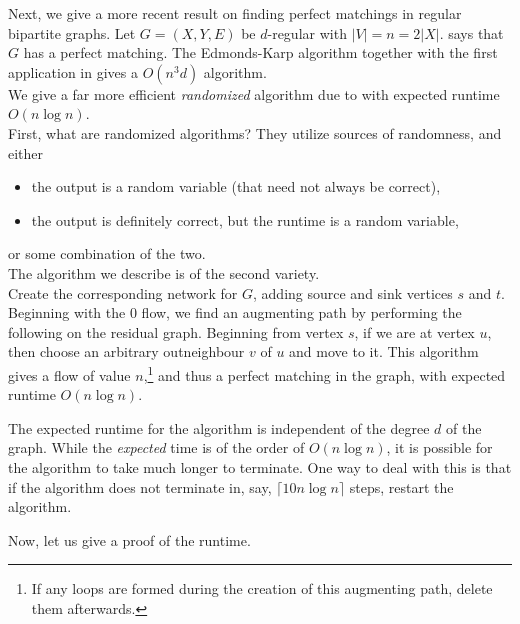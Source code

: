 			Next, we give a more recent result on finding perfect matchings in regular bipartite graphs. Let $G = (X,Y,E)$ be $d$-regular with $|V| = n = 2|X|$.  says that $G$ has a perfect matching. The Edmonds-Karp algorithm together with the first application in  gives a $O(n^3 d)$ algorithm.\\
			We give a far more efficient \emph{randomized} algorithm due to \cite{Goel11perfectmatchings} with expected runtime $O(n\log n)$.\\
			First, what are randomized algorithms? They utilize sources of randomness, and either
			\begin{itemize}
				\item the output is a random variable (that need not always be correct),
				\item the output is definitely correct, but the runtime is a random variable,
			\end{itemize}
			or some combination of the two.\\
			The algorithm we describe is of the second variety.\\
			Create the corresponding network for $G$, adding source and sink vertices $s$ and $t$. Beginning with the $0$ flow, we find an augmenting path by performing the following on the residual graph. Beginning from vertex $s$, if we are at vertex $u$, then choose an arbitrary outneighbour $v$ of $u$ and move to it. This algorithm gives a flow of value $n$,\footnote{If any loops are formed during the creation of this augmenting path, delete them afterwards.} and thus a perfect matching in the graph, with expected runtime $O(n\log n)$.
			\begin{remark}
				The expected runtime for the algorithm is independent of the degree $d$ of the graph. While the \emph{expected} time is of the order of $O(n\log n)$, it is possible for the algorithm to take much longer to terminate. One way to deal with this is that if the algorithm does not terminate in, say, $\lceil10 n\log n\rceil$ steps, restart the algorithm.
			\end{remark}

			Now, let us give a proof of the runtime.

